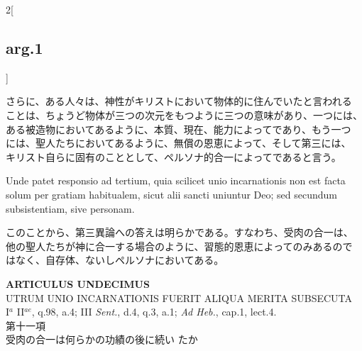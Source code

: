 \documentclass[paper=a4paper,fontsize=10pt,jafontsize=9pt,titlepage]{jlreq}
\begin{document}
\begin{paracol}{2}[\subsection{arg.1}]
\switchcolumn

さらに、ある人々は、神性がキリストにおいて物体的に住んでいたと言われる
ことは、ちょうど物体が三つの次元をもつように三つの意味があり、一つには、
ある被造物においてあるように、本質、現在、能力によってであり、もう一つ
には、聖人たちにおいてあるように、無償の恩恵によって、そして第三には、
キリスト自らに固有のこととして、ペルソナ的合一によってであると言う。

\switchcolumn*

Unde patet responsio ad tertium, quia scilicet unio incarnationis non
est facta solum per gratiam habitualem, sicut alii sancti uniuntur
Deo; sed secundum subsistentiam, sive personam.

\switchcolumn

このことから、第三異論への答えは明らかである。すなわち、受肉の合一は、
他の聖人たちが神に合一する場合のように、習態的恩恵によってのみあるので
はなく、自存体、ないしペルソナにおいてある。

\end{paracol}
\newpage





{}
\setcounter{section}{11}
\setcounter{subsection}{0}
\begin{center}
{\Large {\bfseries ARTICULUS UNDECIMUS}}\\ {\large UTRUM UNIO INCARNATIONIS
FUERIT ALIQUA MERITA SUBSECUTA}\\ {\footnotesize I$^a$ II$^{ae}$,
q.98, a.4; III {\itshape Sent.}, d.4, q.3, a.1; {\itshape Ad Heb.},
cap.1, lect.4.}\\ {\Large 第十一項\\受肉の合一は何らかの功績の後に続い
たか}
\end{center}
\end{document}
